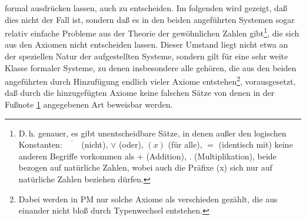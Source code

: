 \documentclass{scrartcl}
\begin{document}
formal ausdrücken lassen, auch zu entscheiden. Im folgenden
wird gezeigt, daß dies nicht der Fall ist, sondern daß 
es in den beiden angeführten Systemen sogar relativ 
einfache Probleme aus der Theorie der gewöhnlichen Zahlen
gibt\footnote{\label{fussnote4}D.\,h. genauer, es gibt unentscheidbare
Sätze, in denen außer den logischen Konstanten:
$\overline{\phantom{XX}}$ (nicht), $\lor$ (oder), 
$(x)$ (für alle), $=$ (identisch mit) keine anderen 
Begriffe vorkommen als $+$ (Addition), $.$ 
(Multiplikation), beide bezogen auf natürliche Zahlen,
wobei auch die Präfixe (x) sich nur auf natürliche Zahlen beziehen dürfen.}, die sich aus den Axiomen nicht 
entscheiden lassen. Dieser Umstand liegt nicht etwa
an der speziellen Natur der aufgestellten Systeme,
sondern gilt für eine sehr weite Klasse formaler Systeme,
zu denen insbesondere alle gehören, die aus den beiden 
angeführten durch Hinzufügung endlich vieler Axiome
entstehen\footnote{Dabei werden in PM nur solche Axiome
als verschieden gezählt, die aus einander nicht bloß
durch Typenwechsel entstehen.}, vorausgesetzt, daß 
durch die hinzugefügten Axiome keine falschen Sätze 
von denen in der Fußnote \ref{fussnote4} angegebenen 
Art beweisbar werden.
\end{document}
